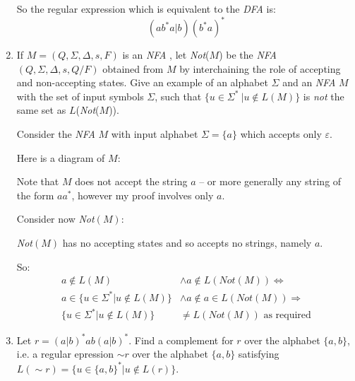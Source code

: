 \documentclass[10pt,\jkfside,a4paper]{article}
\newcommand{\dfa}{\textit{DFA} }
\newcommand{\nfa}{\textit{NFA} }
\begin{document}
\begin{enumerate}
So the regular expression which is equivalent to the \dfa is:
\[(ab^*a|b)(b^*a)^*
\]

\item If $M = (Q, \Sigma, \Delta, s, F)$ is an \nfa, let \textit{Not}($M$) be the 
\nfa $(Q, \Sigma, \Delta, s, Q / F)$ obtained from $M$ by interchaining the role of accepting 
and non-accepting states. Give an example of an alphabet $\Sigma$ and an \nfa $M$ with the 
set of input symbols $\Sigma$, such that $\{u \in \Sigma^*\ | u \notin L(M)\}$ is \textit{not} 
the same set as $L$(\textit{Not}($M$)).

Consider the \nfa $M$ with input alphabet $\Sigma = \{a\}$ which accepts only $\varepsilon$.

Here is a diagram of $M$:

\begin{center}
\end{center}

Note that $M$ does not accept the string $a$ -- or more generally any string of the form 
$aa^*$, however my proof involves only $a$.

Consider now \textit{Not}$(M)$:

\begin{center}
\end{center}

\textit{Not}$(M)$ has no accepting states and so accepts no strings, namely $a$.

So:
\[
\begin{split}
a \notin L(M) &\wedge a \notin L(\textit{Not}(M)) \Longleftrightarrow \\
a \in \{u \in \Sigma^*| u \notin L(M)\} &\wedge a \notin a \in L(\textit{Not}(M)) \Longrightarrow \\
\{u \in \Sigma^*| u \notin L(M)\} &\neq L(\textit{Not}(M)) \text{ as required}
\end{split}
\]

\item Let $r = (a|b)^*ab(a|b)^*$. Find a complement for $r$ over the alphabet $\{a, b\}$, i.e. a 
regular epression $\sim r$ over the alphabet $\{a, b\}$ satisfying $L(\sim r) = \{u \in \{a, b\}^* | u \notin L(r)\}$.


\end{enumerate}
\end{document}
